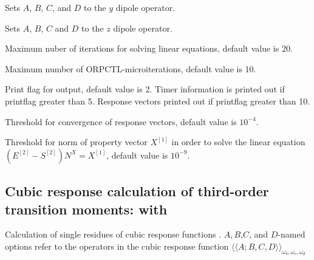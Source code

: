 \begin{description}
\item{}
Sets $A$, $B$, $C$, and $D$ to the $y$ dipole operator.

\item{}
Sets $A$, $B$, $C$ and $D$ to the $z$ dipole operator.

\item{}
Maximum nuber of iterations for solving linear equations, default value is 20.

\item{}
Maximum number of ORPCTL-microiterations, default value is 10.

\item{}
Print flag for output, default value is 2. Timer information is printed
out if printflag greater than 5. Response vectors printed out if
printflag greater than 10.

\item{}
Threshold for convergence of response vectors, default value is $10^{-4}$.

\item{}
Threshold for norm of property vector $X^{[1]}$ in order to solve the linear
equation \\
$\left( E^{[2]} - S^{[2]} \right)N^{X} = X^{[1]}$, default
value is $10^{-9}$. 



\end{description}

\subsection{Cubic response calculation of third-order transition moments:
 with }
Calculation of single residues of
cubic response functions
\cite{pndjovhacpl242,djpnhajcp105,pndjhapdkrthhkcpl253}.
$A,B$,$C$, and $D$-named options refer to the operators in the cubic
response function 
$\langle\!\langle A;B,C,D \rangle\!\rangle_{\omega_b,\omega_c,\omega_d}$

